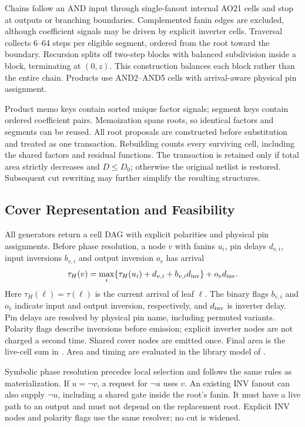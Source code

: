 Chains follow an AND input through single-fanout internal AO21 cells and stop at outputs or branching boundaries. Complemented fanin edges are excluded, although coefficient signals may be driven by explicit inverter cells. Traversal collects 6--64 steps per eligible segment, ordered from the root toward the boundary. Recursion splits off two-step blocks with balanced subdivision inside a block, terminating at $(0,z)$. This construction balances each block rather than the entire chain. Products use AND2--AND5 cells with arrival-aware physical pin assignment.

Product memo keys contain sorted unique factor signals; segment keys contain ordered coefficient pairs. Memoization spans roots, so identical factors and segments can be reused. All root proposals are constructed before substitution and treated as one transaction. Rebuilding counts every surviving cell, including the shared factors and residual functions. The transaction is retained only if total area strictly decreases and $D\le D_0$; otherwise the original netlist is restored. Subsequent cut rewriting may further simplify the resulting structures.

\subsection{Cover Representation and Feasibility}
All generators return a cell DAG with explicit polarities and physical pin assignments. Before phase resolution, a node $v$ with fanins $u_i$, pin delays $d_{v,i}$, input inversions $b_{v,i}$ and output inversion $o_v$ has arrival
\begin{equation}
 \tau_H(v)=\max_i\{\tau_H(u_i)+d_{v,i}+b_{v,i}d_{\rm inv}\}
                  +o_vd_{\rm inv}.\label{eq:delay}
\end{equation}
Here $\tau_H(\ell)=\tau(\ell)$ is the current arrival of leaf $\ell$. The binary flags $b_{v,i}$ and $o_v$ indicate input and output inversion, respectively, and $d_{\rm inv}$ is inverter delay. Pin delays are resolved by physical pin name, including permuted variants. Polarity flags describe inversions before emission; explicit inverter nodes are not charged a second time. Shared cover nodes are emitted once. Final area is the live-cell sum in . Area and timing are evaluated in the library model of .

Symbolic phase resolution precedes local selection and follows the same rules as materialization. If $u=\neg v$, a request for $\neg u$ uses $v$. An existing INV fanout can also supply $\neg u$, including a shared gate inside the root's fanin. It must have a live path to an output and must not depend on the replacement root. Explicit INV nodes and polarity flags use the same resolver; no cut is widened.

